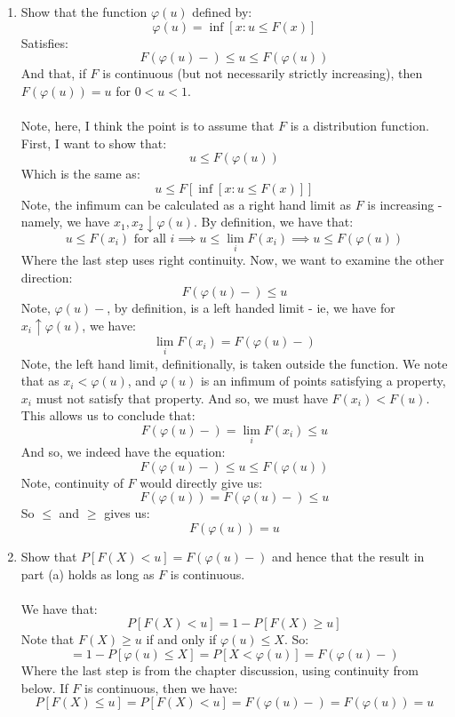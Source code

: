 \documentclass[12pt,a4paper]{article}
\newcommand{\1}[1]{\mathbbm{1}\left\{ #1 \right\}}
\begin{document}
\begin{enumerate}
	\item Show that the function $\varphi(u)$ defined by:
	$$
		\varphi(u) = \inf\left[x : u \leq F(x)\right]
	$$
	Satisfies:
	$$
		F(\varphi(u)-) \leq u \leq F(\varphi(u))
	$$
	And that, if $F$ is continuous (but not necessarily strictly increasing), then $F(\varphi(u)) = u$ for $0 < u < 1$.
	\\\\
	Note, here, I think the point is to assume that $F$ is a distribution function. First, I want to show that:
	$$
		u \leq F(\varphi(u))
	$$
	Which is the same as:
	$$
		u \leq F\left[\inf\left[x : u \leq F(x)\right]\right]
	$$
	Note, the infimum can be calculated as a right hand limit as $F$ is increasing - namely, we have $x_1, x_2 \downarrow \varphi(u)$. By definition, we have that:
	$$
		u \leq F(x_i) \text{ for all $i$} \implies
		u \leq \lim_i F(x_i) \implies
		u \leq F(\varphi(u))
	$$
	Where the last step uses right continuity. Now, we want to examine the other direction:
	$$
		F(\varphi(u)-) \leq u
	$$
	Note, $\varphi(u)-$, by definition, is a left handed limit - ie, we have for $x_i \uparrow \varphi(u)$, we have:
	$$
		\lim_i F(x_i) = F(\varphi(u)-)
	$$
	Note, the left hand limit, definitionally, is taken outside the function. We note that as $x_i < \varphi(u)$, and $\varphi(u)$ is an infimum of points satisfying a property, $x_i$ must not satisfy that property. And so, we must have $F(x_i) < F(u)$. This allows us to conclude that:
	$$
		F(\varphi(u)-) = \lim_i F(x_i) \leq u
	$$
	And so, we indeed have the equation:
	$$
		F(\varphi(u)-) \leq u \leq F(\varphi(u))
	$$
	Note, continuity of $F$ would directly give us:
	$$
		F(\varphi(u)) = F(\varphi(u)-) \leq u
	$$
	So $\leq$ and $\geq$ gives us:
	$$
		 F(\varphi(u)) = u
	$$
	
	\item Show that $P[F(X) < u] = F(\varphi(u)-)$ and hence that the result in part (a) holds as long as $F$ is continuous.
	\\\\
	We have that:
	$$
		P[F(X) < u] = 1 - P[F(X) \geq u]
	$$
	Note that $F(X) \geq u$ if and only if $\varphi(u) \leq X$. So:
	$$
		= 1 - P[\varphi(u) \leq X] = P[X < \varphi(u)] = F(\varphi(u)-)
	$$
	Where the last step is from the chapter discussion, using continuity from below. If $F$ is continuous, then we have:
	$$
		P[F(X) \leq u] = P[F(X) < u] = F(\varphi(u)-) = F(\varphi(u)) = u
	$$
\end{enumerate}
\end{document}
